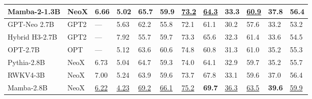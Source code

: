 \documentclass{article}
\begin{document}
\begin{table}[ht]
{\begin{tabular}{@{}llllllllllll@{}}
      \textbf{Mamba-2-1.3B} & NeoX        & \textbf{6.66}              & \textbf{5.02}              & \textbf{65.7}             & \textbf{59.9}              & \underline{73.2}          & \underline{64.3}          & \textbf{33.3}                         & \underline{60.9}                        & \textbf{37.8}                           & \textbf{56.4} \\
      \midrule
      GPT-Neo 2.7B          & GPT2        & ---                        & 5.63                       & 62.2                      & 55.8                       & 72.1                      & 61.1                      & 30.2                                  & 57.6                                    & 33.2                                    & 53.2 \\
      Hybrid H3-2.7B        & GPT2        & ---                        & 7.92                       & 55.7                      & 59.7                       & 73.3                      & 65.6                      & 32.3                                  & 61.4                                    & 33.6                                    & 54.5 \\
      OPT-2.7B              & OPT         & ---                        & 5.12                       & 63.6                      & 60.6                       & 74.8                      & 60.8                      & 31.3                                  & 61.0                                    & 35.2                                    & 55.3 \\
      Pythia-2.8B           & NeoX        & 6.73                       & 5.04                       & 64.7                      & 59.3                       & 74.0                      & 64.1                      & 32.9                                  & 59.7                                    & 35.2                                    & 55.7 \\
      RWKV4-3B              & NeoX        & 7.00                       & 5.24                       & 63.9                      & 59.6                       & 73.7                      & 67.8                      & 33.1                                  & 59.6                                    & 37.0                                    & 56.4 \\
      Mamba-2.8B            & NeoX        & \underline{6.22}           & \underline{4.23}           & \underline{69.2}          & \underline{66.1}           & \underline{75.2}          & \textbf{69.7}             & \underline{36.3}                      & \underline{63.5}                        & \textbf{39.6}                           & \underline{59.9} \\

\end{tabular}}
\end{table}
\end{document}
